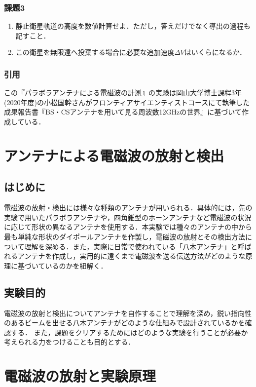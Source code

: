 \documentclass[a4j,10pt,oneside,openany]{jsbook}
\begin{document}
{\subsubsection{課題3}
\begin{enumerate}[(1)]
  \item 静止衛星軌道の高度を数値計算せよ．ただし，答えだけでなく導出の過程も記すこと．
  \item この衛星を無限遠へ投棄する場合に必要な追加速度$\Delta V$はいくらになるか．
\end{enumerate}

\subsubsection{引用}
この『パラボラアンテナによる電磁波の計測』の実験は岡山大学博士課程3年(2020年度)の小松国幹さんがフロンティアサイエンティストコースにて執筆した成果報告書『BS・CSアンテナを用いて見る周波数12GHzの世界』に基づいて作成している．

\newpage

\section{アンテナによる電磁波の放射と検出}
\subsection{はじめに}
電磁波の放射・検出には様々な種類のアンテナが用いられる．具体的には，先の実験で用いたパラボラアンテナや，四角錐型のホーンアンテナなど電磁波の状況に応じて形状の異なるアンテナを使用する．本実験では種々のアンテナの中から最も単純な形状のダイポールアンテナを作製し，電磁波の放射とその検出方法について理解を深める．また，実際に日常で使われている「八木アンテナ」と呼ばれるアンテナを作成し，実用的に遠くまで電磁波を送る伝送方法がどのような原理に基づいているのかを紐解く．


\subsection{実験目的}
電磁波の放射と検出についてアンテナを自作することで理解を深め，鋭い指向性のあるビームを出せる八木アンテナがどのような仕組みで設計されているかを確認する．
また，課題をクリアするためにはどのような実験を行うことが必要か考えられる力をつけることも目的とする．

\section{電磁波の放射と実験原理}
}
\end{document}
